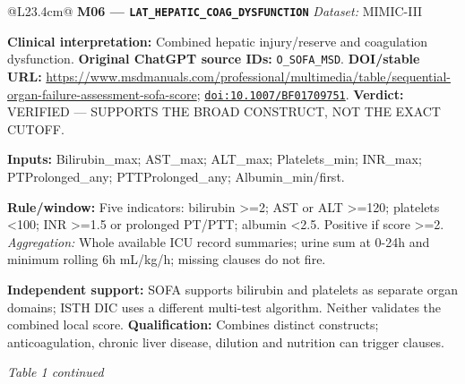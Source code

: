 \begin{tabular}{@{}L{23.4cm}@{}}
\addlinespace[3pt]
\midrule
\textbf{M06 --- \nolinkurl{LAT_HEPATIC_COAG_DYSFUNCTION}} \hfill \textit{Dataset:} MIMIC-III\par\textbf{Clinical interpretation:} Combined hepatic injury/reserve and coagulation dysfunction. \textbf{Original ChatGPT source IDs:} \nolinkurl{O_SOFA_MSD}. \textbf{DOI/stable URL:} \url{https://www.msdmanuals.com/professional/multimedia/table/sequential-organ-failure-assessment-sofa-score}; \allowbreak \href{https://doi.org/10.1007/BF01709751}{\nolinkurl{doi:10.1007/BF01709751}}. \textbf{Verdict:} VERIFIED --- SUPPORTS THE BROAD CONSTRUCT, NOT THE EXACT CUTOFF.\par\textbf{Inputs:} Bilirubin\_max; AST\_max; ALT\_max; Platelets\_min; INR\_max; PTProlonged\_any; PTTProlonged\_any; Albumin\_min/first.\par\textbf{Rule/window:} Five indicators: bilirubin >=2; AST or ALT >=120; platelets <100; INR >=1.5 or prolonged PT/PTT; albumin <2.5. Positive if score >=2. \textit{Aggregation:} Whole available ICU record summaries; urine sum at 0-24h and minimum rolling 6h mL/kg/h; missing clauses do not fire.\par\textbf{Independent support:} SOFA supports bilirubin and platelets as separate organ domains; ISTH DIC uses a different multi-test algorithm. Neither validates the combined local score. \textbf{Qualification:} Combines distinct constructs; anticoagulation, chronic liver disease, dilution and nutrition can trigger clauses. \\
\addlinespace[3pt]
\midrule
\bottomrule
\end{tabular}
\clearpage
\textit{Table 1 continued}\par
